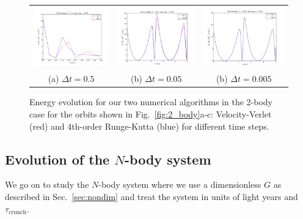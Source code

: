 \documentclass{article}
\begin{document}
\begin{multicols}{2}
\begin{figure}
\begin{center}
\begin{tabular}{ccc}
  	\includegraphics[width=60mm]{Images/Earth-Sun/EarthSun_energy_05.png}
	& \includegraphics[width=60mm]{Images/Earth-Sun/EarthSun_energy_005.png}
	& \includegraphics[width=60mm]{Images/Earth-Sun/EarthSun_energy_0005.png} \\
	(a) $\Delta t = 0.5$		& (b) $\Delta t = 0.05$		& (b) $\Delta t = 0.005$  \\[6pt]
\end{tabular}
\caption{Energy evolution for our two numerical algorithms in the 2-body case for the orbits shown in Fig.~\ref{fig:2_body}a-c: Velocity-Verlet (red) and 4th-order Runge-Kutta (blue) for different time steps.}\label{fig:2_body_energy}
\end{center}
\end{figure}



\subsection{Evolution of the $N$-body system}
We go on to study the $N$-body system where we use a dimensionless $G$ as described in Sec.~\ref{sec:nondim} and treat the system in units of light years and $\tau_{\mathrm{crunch}}$. 


\end{multicols}
\end{document}
